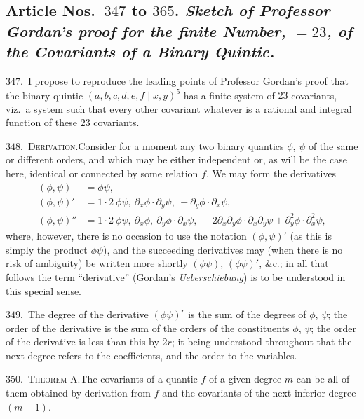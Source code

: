 \documentclass[11pt,a4paper]{article}
\providecommand{\midbar}{\mid}
\begin{document}
\medskip

\subsection*{Article Nos.\ $347$ to $365$. \textit{Sketch of Professor
Gordan's proof for the finite Number, $= 23$, of the Covariants of a
Binary Quintic.}}

\noindent$347$.\ I propose to reproduce the leading points of Professor
Gordan's proof that the binary quintic $(a, b, c, d, e, f\!\midbar\!
x, y)^{5}$ has a finite system of $23$ covariants, viz.\ a system such that
every other covariant whatever is a rational and integral function of these
$23$ covariants.

\noindent$348$.\ \textsc{Derivation.}\quad Consider for a moment any two
binary quantics $\phi$, $\psi$ of the same or different orders, and which
may be either independent or, as will be the case here, identical or
connected by some relation $f$. We may form the derivatives
\[
\begin{aligned}
(\phi,\psi) &= \phi\psi,\\
(\phi,\psi)' &= 1\!\cdot\!2\ \phi\psi,\ \partial_{x}\phi\!\cdot\!\partial_{y}\psi,
\ -\partial_{y}\phi\!\cdot\!\partial_{x}\psi,\\
(\phi,\psi)'' &= 1\!\cdot\!2\ \phi\psi,\ \partial_{x}\phi,\
\partial_{y}\phi\!\cdot\!\partial_{x}\psi,\
-2\partial_{x}\partial_{y}\phi\!\cdot\!\partial_{x}\partial_{y}\psi
+ \partial_{y}^{2}\phi\!\cdot\!\partial_{x}^{2}\psi,
\end{aligned}
\]
where, however, there is no occasion to use the notation $(\phi,\psi)'$ (as
this is simply the product $\phi\psi$), and the succeeding derivatives may
(when there is no risk of ambiguity) be written more shortly $(\phi\psi)$,
$(\phi\psi)'$, \&c.; in all that follows the term ``derivative''
(Gordan's \textit{Ueberschiebung}) is to be understood in this special
sense.

\noindent$349$.\ The degree of the derivative $(\phi\psi)^{r}$ is the sum
of the degrees of $\phi$, $\psi$; the order of the derivative is the sum
of the orders of the constituents $\phi$, $\psi$; the order of the
derivative is less than this by $2r$; it being understood throughout that
the next degree refers to the coefficients, and the order to the variables.

\noindent$350$.\ \textsc{Theorem A}.\quad The covariants of a quantic
$f$ of a given degree $m$ can be all of them obtained by derivation from
$f$ and the covariants of the next inferior degree $(m-1)$.
\end{document}
